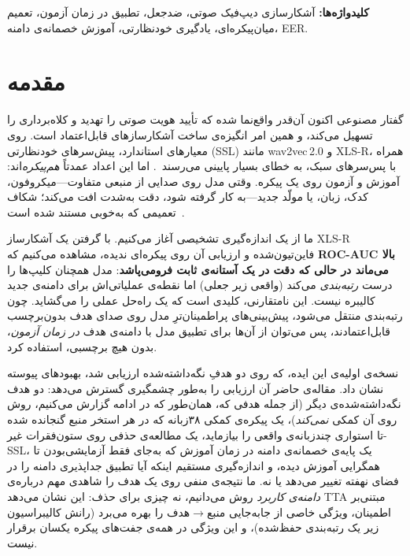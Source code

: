 \documentclass[a4paper,11pt]{article}
\begin{document}
\textbf{کلیدواژه‌ها:} آشکارسازی دیپ‌فیک صوتی، ضدجعل، تطبیق در زمان آزمون،
تعمیم میان‌پیکره‌ای، یادگیری خودنظارتی، آموزش خصمانه‌ی دامنه، EER.

\section{مقدمه}
گفتار مصنوعی اکنون آن‌قدر واقع‌نما شده که تأیید هویت صوتی را تهدید و کلاه‌برداری
را تسهیل می‌کند، و همین امر انگیزه‌ی ساخت آشکارسازهای قابل‌اعتماد است. روی
معیارهای استاندارد، پیش‌سرهای خودنظارتی (SSL) مانند wav2vec\,2.0 و XLS-R،
همراه با پس‌سرهای سبک، به خطای بسیار پایینی می‌رسند~\cite{wav2vec2aug,xlsrsls,aasist}.
اما این اعداد عمدتاً \emph{هم‌پیکره}‌اند: آموزش و آزمون روی یک پیکره. وقتی
مدل روی صدایی از منبعی متفاوت---میکروفون، کدک، زبان، یا مولّد جدید---به کار
گرفته شود، دقت به‌شدت افت می‌کند؛ شکاف تعمیمی که به‌خوبی مستند شده
است~\cite{asdg,crossdomain,itw}.

ما از یک اندازه‌گیری تشخیصی آغاز می‌کنیم. با گرفتن یک آشکارساز XLS-R
فاین‌تیون‌شده و ارزیابی آن روی پیکره‌ای ندیده، مشاهده می‌کنیم که \textbf{ROC-AUC
بالا می‌ماند در حالی که دقت در یک آستانه‌ی ثابت فرومی‌پاشد}: مدل همچنان
کلیپ‌ها را درست \emph{رتبه‌بندی} می‌کند (واقعی زیر جعلی) اما نقطه‌ی عملیاتی‌اش
برای دامنه‌ی جدید کالیبره نیست. این نامتقارنی، کلیدی است که یک راه‌حل عملی
را می‌گشاید. چون رتبه‌بندی منتقل می‌شود، پیش‌بینی‌های پراطمینان‌ترِ مدل روی
صدای هدف بدون‌برچسب قابل‌اعتمادند، پس می‌توان از آن‌ها برای تطبیق مدل با
دامنه‌ی هدف \emph{در زمان آزمون}، بدون هیچ برچسبی، استفاده کرد.

نسخه‌ی اولیه‌ی این ایده، که روی دو هدفِ نگه‌داشته‌شده ارزیابی شد، بهبودهای
پیوسته نشان داد. مقاله‌ی حاضر آن ارزیابی را به‌طور چشمگیری گسترش می‌دهد: دو
هدف نگه‌داشته‌شده‌ی دیگر (از جمله هدفی که، همان‌طور که در ادامه گزارش
می‌کنیم، روش روی آن کمکی \emph{نمی‌کند})، یک پیکره‌ی کمکی ۳۸‌زبانه که در هر
استخر منبع گنجانده شده تا استواری چندزبانه‌ی واقعی را بیازماید، یک مطالعه‌ی
حذفی روی ستون‌فقرات غیر-SSL، یک پایه‌ی خصمانه‌ی دامنه در زمان آموزش که
به‌جای فقط آزمایشی‌بودن تا همگرایی آموزش دیده، و اندازه‌گیری مستقیم اینکه
آیا تطبیق جداپذیری دامنه را در فضای نهفته تغییر می‌دهد یا نه. ما نتیجه‌ی
منفی روی یک هدف را شاهدی مهم درباره‌ی \emph{دامنه‌ی کاربرد} روش می‌دانیم، نه
چیزی برای حذف: این نشان می‌دهد TTA مبتنی‌بر اطمینان، ویژگی خاصی از جابه‌جایی
منبع$\to$هدف را بهره می‌برد (رانش کالیبراسیون زیر یک رتبه‌بندی حفظ‌شده)، و
این ویژگی در همه‌ی جفت‌های پیکره یکسان برقرار نیست.
\end{document}
